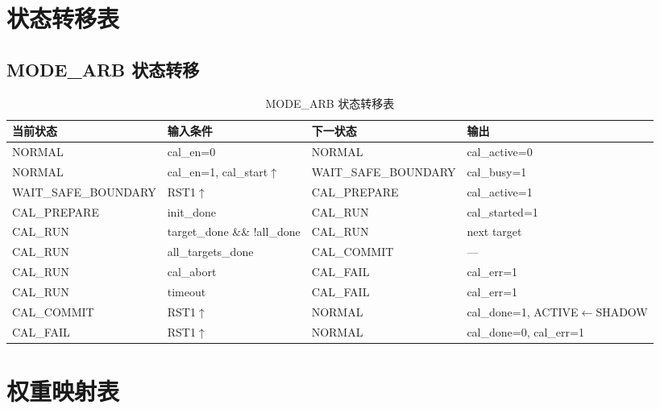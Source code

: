 \documentclass[UTF8,a4paper,11pt]{ctexart}
\begin{document}
\section{状态转移表}
\label{app:state-trans}

\subsection{MODE\_ARB 状态转移}

\begin{table}[H]
\centering
\caption{MODE\_ARB 状态转移表}
\label{tab:app-modearb-trans}
\small
\begin{tabular}{llll}
\toprule
当前状态 & 输入条件 & 下一状态 & 输出 \\
\midrule
NORMAL              & cal\_en=0                & NORMAL               & cal\_active=0 \\
NORMAL              & cal\_en=1, cal\_start$\uparrow$ & WAIT\_SAFE\_BOUNDARY & cal\_busy=1 \\
WAIT\_SAFE\_BOUNDARY & RST1$\uparrow$           & CAL\_PREPARE         & cal\_active=1 \\
CAL\_PREPARE        & init\_done               & CAL\_RUN             & cal\_started=1 \\
CAL\_RUN            & target\_done \&\& !all\_done & CAL\_RUN          & next target \\
CAL\_RUN            & all\_targets\_done        & CAL\_COMMIT          & --- \\
CAL\_RUN            & cal\_abort               & CAL\_FAIL            & cal\_err=1 \\
CAL\_RUN            & timeout                  & CAL\_FAIL            & cal\_err=1 \\
CAL\_COMMIT         & RST1$\uparrow$           & NORMAL               & cal\_done=1, ACTIVE$\leftarrow$SHADOW \\
CAL\_FAIL           & RST1$\uparrow$           & NORMAL               & cal\_done=0, cal\_err=1 \\
\bottomrule
\end{tabular}
\end{table}

\section{权重映射表}
\label{app:weight-mapping}
\end{document}
